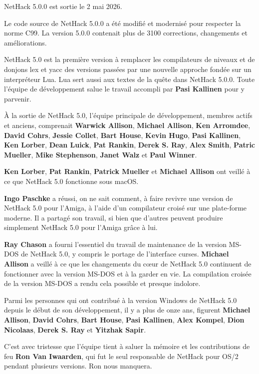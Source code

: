 \documentclass[titlepage]{article}
\begin{document}
NetHack 5.0.0 est sortie le 2 mai 2026.


Le code source de NetHack 5.0.0 a été modifié et modernisé pour respecter la
norme C99.
La version 5.0.0 contenait plus de 3100 corrections, changements et
améliorations.


NetHack 5.0 est la première version à remplacer les compilateurs de
niveaux et de donjons lex et yacc des versions passées par une nouvelle
approche fondée sur un interpréteur Lua.
Lua sert aussi aux textes de la quête dans NetHack 5.0.0.
Toute l'équipe de développement salue le travail accompli par \textbf{Pasi
Kallinen} pour y parvenir.


À la sortie de NetHack 5.0, l'équipe principale de développement, membres
actifs et anciens, comprenait \textbf{Warwick Allison}, \textbf{Michael Allison},
\textbf{Ken Arromdee}, \textbf{David Cohrs}, \textbf{Jessie Collet}, \textbf{Bart House},
\textbf{Kevin Hugo}, \textbf{Pasi Kallinen}, \textbf{Ken Lorber}, \textbf{Dean Luick},
\textbf{Pat Rankin}, \textbf{Derek S. Ray}, \textbf{Alex Smith}, \textbf{Patric Mueller},
\textbf{Mike Stephenson}, \textbf{Janet Walz} et \textbf{Paul Winner}.


\textbf{Ken Lorber}, \textbf{Pat Rankin}, \textbf{Patrick Mueller} et
\textbf{Michael Allison} ont veillé à ce que NetHack 5.0 fonctionne sous
macOS.


\textbf{Ingo Paschke} a réussi, on ne sait comment, à faire revivre une
version de NetHack 5.0 pour l'Amiga, à l'aide d'un compilateur croisé sur
une plate-forme moderne.
Il a partagé son travail, si bien que d'autres peuvent produire simplement
NetHack 5.0 pour l'Amiga grâce à lui.


\textbf{Ray Chason} a fourni l'essentiel du travail de maintenance de la
version MS-DOS de NetHack 5.0, y compris le portage de l'interface curses.
\textbf{Michael Allison} a veillé à ce que les changements du cœur de
NetHack 5.0 continuent de fonctionner avec la version MS-DOS et à la
garder en vie.
La compilation croisée de la version MS-DOS a rendu cela possible et
presque indolore.


Parmi les personnes qui ont contribué à la version Windows de NetHack 5.0
depuis le début de son développement, il y a plus de onze ans, figurent
\textbf{Michael Allison}, \textbf{David Cohrs}, \textbf{Bart House},
\textbf{Pasi Kallinen}, \textbf{Alex Kompel}, \textbf{Dion Nicolaas},
\textbf{Derek S. Ray} et \textbf{Yitzhak Sapir}.


C'est avec tristesse que l'équipe tient à saluer la mémoire et les
contributions de feu \textbf{Ron Van Iwaarden}, qui fut le seul responsable de
NetHack pour OS/2 pendant plusieurs versions.
Ron nous manquera.
\end{document}
